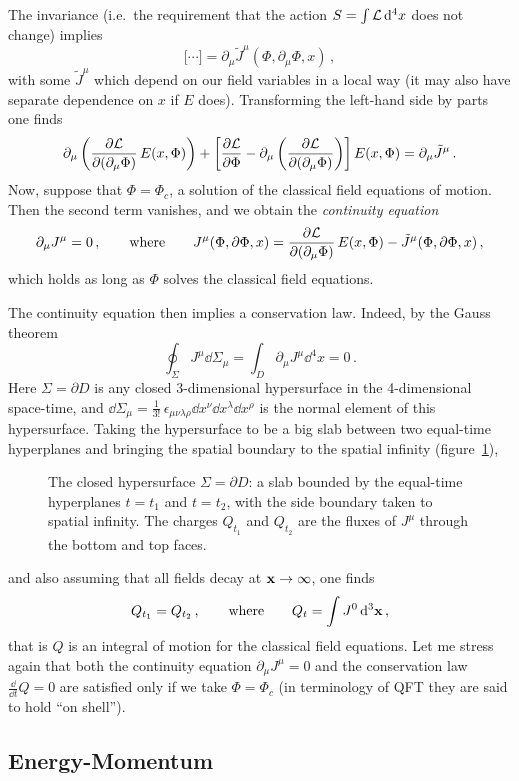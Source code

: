 The invariance (i.e.\ the requirement that the action $S=\int\mathcal{L}\mathop{}\!\mathrm{d}^4x$
does not change) implies
\[
\bigl[\cdots\bigr]=\partial_\mu\tilde J^\mu(\Phi,\partial_\mu\Phi,x)\,,
\]
with some $\tilde J^\mu$ which depend on our field variables in a local way
(it may also have separate dependence on $x$ if $E$ does). Transforming the
left-hand side by parts one finds
\[
\partial_\mu\left(\frac{\partial\mathcal{L}}{\partial(\partial_\mu\Phi)}\,E(x,\Phi)\right)
+\left[\frac{\partial\mathcal{L}}{\partial\Phi}-\partial_\mu\left(\frac{\partial\mathcal{L}}{\partial(\partial_\mu\Phi)}\right)\right]E(x,\Phi)=\partial_\mu\tilde J^\mu\,.
\]
Now, suppose that $\Phi=\Phi_c$, a solution of the classical field equations
of motion. Then the second term vanishes, and we obtain the \emph{continuity
equation}
\[
\partial_\mu J^\mu=0\,,
\qquad\text{where}\qquad
J^\mu(\Phi,\partial\Phi,x)=\frac{\partial\mathcal{L}}{\partial(\partial_\mu\Phi)}\,E(x,\Phi)-\tilde J^\mu(\Phi,\partial\Phi,x)\,,
\]
which holds as long as $\Phi$ solves the classical field equations.

The continuity equation then implies a conservation law. Indeed, by the Gauss
theorem
\[
\oint_\Sigma J^\mu\dd\Sigma_\mu=\int_D\partial_\mu J^\mu\dd^4x=0\,.
\]
Here $\Sigma=\partial D$ is any closed 3-dimensional hypersurface in the
4-dimensional space-time, and
$\dd\Sigma_\mu=\frac{1}{3!}\,\epsilon_{\mu\nu\lambda\rho}\dd x^\nu \dd x^\lambda \dd x^\rho$
is the normal element of this hypersurface. Taking the hypersurface to be a
big slab between two equal-time hyperplanes and bringing the spatial boundary
to the spatial infinity (figure~\ref{fig:slab}),
\begin{figure}[ht]
\centering{}
\caption{The closed hypersurface $\Sigma=\partial D$: a slab bounded by the
equal-time hyperplanes $t=t_1$ and $t=t_2$, with the side boundary taken to
spatial infinity. The charges $Q_{t_1}$ and $Q_{t_2}$ are the fluxes of $J^\mu$
through the bottom and top faces.}
\label{fig:slab}
\end{figure}
and also assuming that all fields decay at $\mathbf{x}\to\infty$, one finds
\[
Q_{t_1}=Q_{t_2}\,,\qquad\text{where}\qquad Q_t=\int J^0\mathop{}\!\mathrm{d}^3\mathbf{x}\,,
\]
that is $Q$ is an integral of motion for the classical field equations. Let
me stress again that both the continuity equation $\partial_\mu J^\mu=0$ and
the conservation law $\frac{\dd}{\dd t}Q=0$ are satisfied only if we take
$\Phi=\Phi_c$ (in terminology of QFT they are said to hold ``on shell'').

\subsection*{Energy-Momentum}

